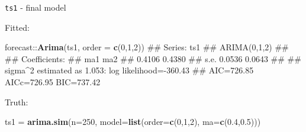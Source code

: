 \documentclass[11pt,ignorenonframetext,]{beamer}
\newenvironment{Shaded}{}{}
\newcommand{\DataTypeTok}[1]{\textcolor[rgb]{0.56,0.13,0.00}{#1}}
\newcommand{\DecValTok}[1]{\textcolor[rgb]{0.25,0.63,0.44}{#1}}
\newcommand{\FloatTok}[1]{\textcolor[rgb]{0.25,0.63,0.44}{#1}}
\newcommand{\KeywordTok}[1]{\textcolor[rgb]{0.00,0.44,0.13}{\textbf{#1}}}
\newcommand{\NormalTok}[1]{#1}
\newcommand{\OperatorTok}[1]{\textcolor[rgb]{0.40,0.40,0.40}{#1}}
\newcommand{\StringTok}[1]{\textcolor[rgb]{0.25,0.44,0.63}{#1}}
\let\oldShaded\Shaded
\let\endoldShaded\endShaded
\renewenvironment{Shaded}{\footnotesize\begin{spacing}{0.9}\oldShaded}{\endoldShaded\end{spacing}}
\let\oldverbatim\verbatim
\let\endoldverbatim\endverbatim
\newcommand{\scriptoutput}{
  \renewenvironment{Shaded}{\scriptsize\begin{spacing}{0.9}\oldShaded}{\endoldShaded\end{spacing}}
  \renewenvironment{verbatim}{\scriptsize\begin{spacing}{0.9}\oldverbatim}{\endoldverbatim\end{spacing}}
}
\begin{document}
\begin{frame}[fragile,t]{%
\protect\hypertarget{ts1---final-model}{%
\texttt{ts1} - final model}}

\scriptoutput

Fitted:

\begin{Shaded}
\begin{Highlighting}[]
\NormalTok{forecast}\OperatorTok{::}\KeywordTok{Arima}\NormalTok{(ts1, }\DataTypeTok{order =} \KeywordTok{c}\NormalTok{(}\DecValTok{0}\NormalTok{,}\DecValTok{1}\NormalTok{,}\DecValTok{2}\NormalTok{))}
\NormalTok{## Series: ts1 }
\NormalTok{## ARIMA(0,1,2) }
\NormalTok{## }
\NormalTok{## Coefficients:}
\NormalTok{##          ma1     ma2}
\NormalTok{##       0.4106  0.4380}
\NormalTok{## s.e.  0.0536  0.0643}
\NormalTok{## }
\NormalTok{## sigma^2 estimated as 1.053:  log likelihood=-360.43}
\NormalTok{## AIC=726.85   AICc=726.95   BIC=737.42}
\end{Highlighting}
\end{Shaded}

Truth:

\begin{Shaded}
\begin{Highlighting}[]
\NormalTok{ts1 =}\StringTok{ }\KeywordTok{arima.sim}\NormalTok{(}\DataTypeTok{n=}\DecValTok{250}\NormalTok{, }\DataTypeTok{model=}\KeywordTok{list}\NormalTok{(}\DataTypeTok{order=}\KeywordTok{c}\NormalTok{(}\DecValTok{0}\NormalTok{,}\DecValTok{1}\NormalTok{,}\DecValTok{2}\NormalTok{), }\DataTypeTok{ma=}\KeywordTok{c}\NormalTok{(}\FloatTok{0.4}\NormalTok{,}\FloatTok{0.5}\NormalTok{))) }
\end{Highlighting}
\end{Shaded}

\end{frame}
\end{document}

